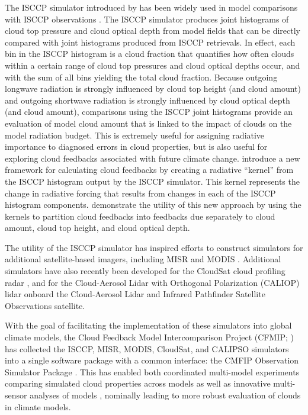 The ISCCP simulator introduced by \citet{klein_and_jakob_1999} has been
widely used in model comparisons with ISCCP observations
\citep{webb_et_al_2001, norris_and_weaver_2001, lin_and_zhang_2004, zhang_et_al_2005, wyant_et_al_2006, klein_et_al_2013}.
The ISCCP simulator produces joint histograms of cloud top pressure and
cloud optical depth from model fields that can be directly compared with
joint histograms produced from ISCCP retrievals. In effect, each bin in
the ISCCP histogram is a cloud fraction that quantifies how often clouds
within a certain range of cloud top pressures and cloud optical depths
occur, and with the sum of all bins yielding the total cloud fraction.
Because outgoing longwave radiation is strongly influenced by cloud top
height (and cloud amount) and outgoing shortwave radiation is strongly
influenced by cloud optical depth (and cloud amount), comparisons using
the ISCCP joint histograms provide an evaluation of model cloud amount
that is linked to the impact of clouds on the model radiation budget.
This is extremely useful for assigning radiative importance to diagnosed
errors in cloud properties, but is also useful for exploring cloud
feedbacks associated with future climate change.
\citet{zelinka_et_al_2012a} introduce a new framework for calculating
cloud feedbacks by creating a radiative ``kernel'' from the ISCCP
histogram output by the ISCCP simulator. This kernel represents the
change in radiative forcing that results from changes in each of the
ISCCP histogram components. \citet{zelinka_et_al_2012b} demonstrate the
utility of this new approach by using the kernels to partition cloud
feedbacks into feedbacks due separately to cloud amount, cloud top
height, and cloud optical depth.

The utility of the ISCCP simulator has inspired efforts to construct
simulators for additional satellite-based imagers, including MISR
\citep{marchand_and_ackerman_2010} and MODIS \citep{pincus_et_al_2012}.
Additional simulators have also recently been developed for the CloudSat
\citep{stephens_et_al_2002} cloud profiling radar
\citep[Quickbeam;][]{haynes_et_al_2007}, and for the Cloud-Aerosol Lidar
with Orthogonal Polarization (CALIOP) lidar \citep{chepfer_et_al_2008}
onboard the Cloud-Aerosol Lidar and Infrared Pathfinder Satellite
Observations \citep[CALIPSO][]{winker_et_al_2007} satellite.

With the goal of facilitating the implementation of these simulators
into global climate models, the Cloud Feedback Model Intercomparison
Project (CFMIP; \citep{webb_et_al_2016}) has collected the ISCCP, MISR,
MODIS, CloudSat, and CALIPSO simulators into a single software package
with a common interface: the CMFIP Observation Simulator Package
\citep[COSP;][]{bodas-salcedo_et_al_2011}. This has enabled both
coordinated multi-model experiments comparing simulated cloud properties
across models as well as innovative multi-sensor analyses of models
\citetext{\citealp[e.g.,][]{bodas-salcedo_et_al_2011}; \citealp{kay_et_al_2012}; \citealp[
\citet{franklin_et_al_2013a}]{klein_et_al_2013}; \citealp{franklin_et_al_2013b}},
nominally leading to more robust evaluation of clouds in climate models.

